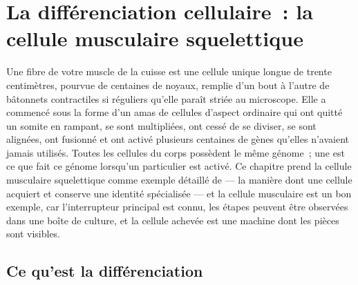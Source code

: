 \chapter{La différenciation cellulaire~: la cellule musculaire squelettique}\label{ch:b2:cell-differentiation}

Une fibre de votre muscle de la cuisse est une cellule unique longue de
trente centimètres, pourvue de centaines de noyaux, remplie d'un bout à
l'autre de bâtonnets contractiles si réguliers qu'elle paraît striée au
microscope. Elle a commencé sous la forme d'un amas de cellules d'aspect
ordinaire qui ont quitté un somite en rampant, se sont multipliées, ont
cessé de se diviser, se sont alignées, ont fusionné et ont activé
plusieurs centaines de gènes qu'elles n'avaient jamais utilisés. Toutes
les cellules du corps possèdent le même génome~; une 
est ce que fait ce génome lorsqu'un  particulier
est activé. Ce chapitre prend la cellule musculaire squelettique comme
exemple détaillé de \emph{} --- la manière dont une
cellule acquiert et conserve une identité spécialisée --- et la cellule
musculaire est un bon exemple, car l'interrupteur principal est connu,
les étapes peuvent être observées dans une boîte de culture, et la
cellule achevée est une machine dont les pièces sont visibles.

\section{Ce qu'est la différenciation}

